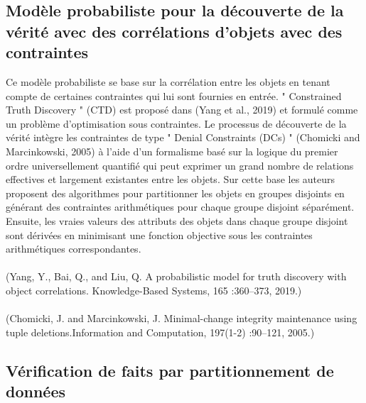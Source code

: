 \documentclass[12pt]{report}
\begin{document}
\subsection{Modèle probabiliste pour la découverte de la vérité avec des corrélations d’objets avec des contraintes}

Ce modèle probabiliste se base sur la corrélation entre les objets en tenant
compte de certaines contraintes qui lui sont fournies en entrée. "
Constrained Truth Discovery " (CTD) est proposé dans (Yang et al., 2019)
et formulé comme un problème d’optimisation sous contraintes. Le
processus de découverte de la vérité intègre les contraintes de type "
Denial Constraints (DCs) " (Chomicki and Marcinkowski, 2005) à l’aide
d’un formalisme basé sur la logique du premier ordre universellement
quantifié qui peut exprimer un grand nombre de relations effectives et
largement existantes entre les objets. Sur cette base les auteurs proposent
des algorithmes pour partitionner les objets en groupes disjoints en
générant des contraintes arithmétiques pour chaque groupe disjoint
séparément. Ensuite, les vraies valeurs des attributs des objets dans chaque
groupe disjoint sont dérivées en minimisant une fonction objective sous les
contraintes arithmétiques correspondantes.
\\ \\(Yang, Y., Bai, Q., and Liu, Q. A probabilistic model for truth discovery
with object correlations. Knowledge-Based Systems, 165 :360–373, 2019.)
\\ \\(Chomicki, J. and Marcinkowski, J. Minimal-change integrity maintenance
using tuple deletions.Information and Computation, 197(1-2) :90–121,
2005.)
\subsection{Vérification de faits par partitionnement de données}
\end{document}
